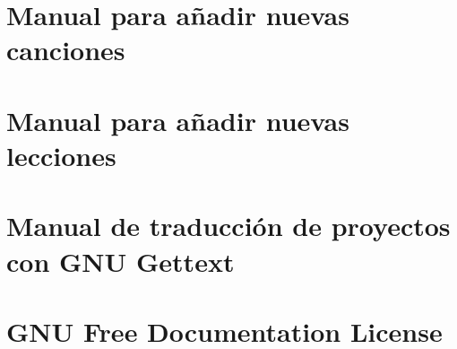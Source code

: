 \documentclass[a4paper,12pt]{scrbook}
\begin{document}
\chapter{Manual para añadir nuevas canciones}
\label{chap:manual_canciones}


\chapter{Manual para añadir nuevas lecciones}


\chapter{Manual de traducción de proyectos con GNU Gettext}
\label{sec:gettext}


\chapter{GNU Free Documentation License}
\label{sec:fdl}







\printindex
\end{document}
